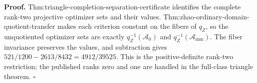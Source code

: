 \textbf{Proof.}
Thm:triangle-completion-separation-certificate identifies the complete rank-two projective optimizer sets and their values.  Thm:zhao-ordinary-domain-quotient-transfer makes each criterion constant on the fibers of \(q_Z\), so the unquotiented optimizer sets are exactly \(q_Z^{-1}(\mathcal A_0)\) and \(q_Z^{-1}(\mathcal A_{\mathrm{mm}})\).  The fiber invariance preserves the values, and subtraction gives \(521/1200-2613/8432=4912/39525\).  This is the positive-definite rank-two restriction; the published ranks zero and one are handled in the full-class triangle theorem. \(\square\)